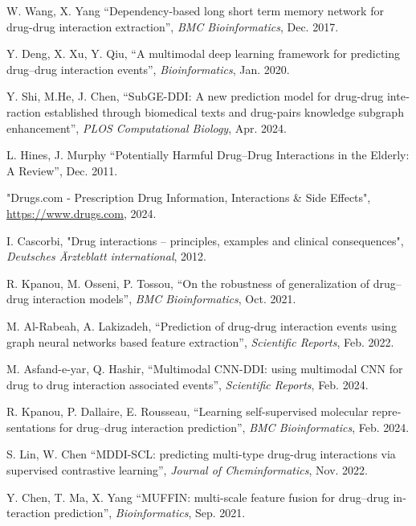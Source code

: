 \begin{thebibliography}{99}
\begin{latin}
W. Wang, X. Yang “Dependency-based long short term memory network for drug-drug interaction extraction”, \textit{BMC Bioinformatics}, Dec. 2017.

Y. Deng, X. Xu, Y. Qiu, “A multimodal deep learning framework for predicting drug–drug interaction events”, \textit{Bioinformatics}, Jan. 2020.

Y. Shi, M.He, J. Chen, “SubGE-DDI: A new prediction model for drug-drug interaction established through biomedical texts and drug-pairs knowledge subgraph enhancement”, \textit{PLOS Computational Biology}, Apr. 2024.

L. Hines, J. Murphy “Potentially Harmful Drug–Drug Interactions in the Elderly: A Review”, Dec. 2011.

"Drugs.com - Prescription Drug Information, Interactions \& Side Effects", \url{https://www.drugs.com}, 2024.

I. Cascorbi, "Drug interactions – principles, examples and clinical consequences", \textit{Deutsches Ärzteblatt international}, 2012.

R. Kpanou, M. Osseni, P. Tossou, “On the robustness of generalization of drug–drug interaction models”, \textit{BMC Bioinformatics}, Oct. 2021.

M. Al-Rabeah, A. Lakizadeh, “Prediction of drug-drug interaction events using graph neural networks based feature extraction”, \textit{Scientific Reports}, Feb. 2022.

M. Asfand-e-yar, Q. Hashir, “Multimodal CNN-DDI: using multimodal CNN for drug to drug interaction associated events”, \textit{Scientific Reports}, Feb. 2024.

R. Kpanou, P. Dallaire, E. Rousseau, “Learning self-supervised molecular representations for drug–drug interaction prediction”, \textit{BMC Bioinformatics}, Feb. 2024.

S. Lin, W. Chen “MDDI-SCL: predicting multi-type drug-drug interactions via supervised contrastive learning”, \textit{Journal of Cheminformatics}, Nov. 2022.

Y. Chen, T. Ma, X. Yang “MUFFIN: multi-scale feature fusion for drug–drug interaction prediction”, \textit{Bioinformatics}, Sep. 2021.


\end{latin}
\end{thebibliography}
